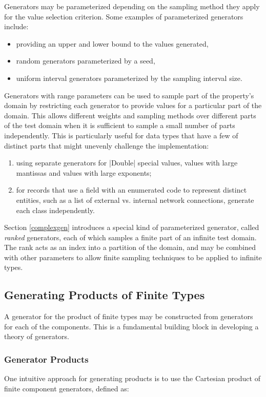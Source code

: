 Generators may be parameterized depending on the sampling method they apply for the value selection criterion.
Some examples of parameterized generators include:
\begin{itemize}
\item providing an upper and lower bound to the values generated,
\item random generators parameterized by a seed,
\item uniform interval generators parameterized by the sampling interval size.
\end{itemize}

Generators with range parameters can be used to 
sample part of the property's domain
by restricting each generator to provide values for a particular part of the domain.
This allows different weights and sampling methods over different parts of the test domain
when it is sufficient to sample a small number of parts independently.
This is particularly useful for data types that have a few of distinct parts
that might unevenly challenge the implementation:

\begin{enumerate}
\item using separate generators for |Double| special values,
values with large mantissas and values with large exponents;
\item for records that use a field with an enumerated code to represent distinct entities,
such as a list of external vs. internal network connections,
generate each class independently.
\end{enumerate}

\noindent
Section \ref{complexgen} introduces a special kind of parameterized generator,
called \emph{ranked} generators,
each of which samples a finite part of an infinite test domain.
The rank acts as an index into a partition of the domain,
and may be combined with other parameters to allow
finite sampling techniques to be applied to infinite types.

\subsection{Generating Products of Finite Types}
A generator for the product of finite types
may be constructed from generators for each of the components.
This is a fundamental building block in developing a theory of generators.

\subsubsection{Generator Products}
One intuitive approach for generating products is to
use the Cartesian product of finite component generators,
defined as:

